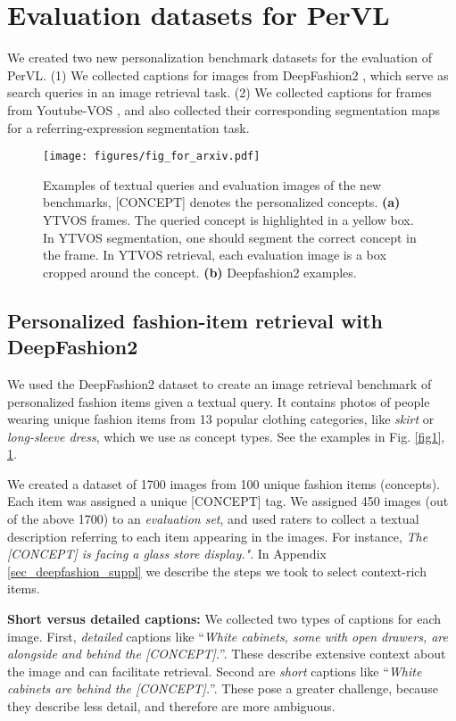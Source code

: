 \documentclass[runningheads]{llncs}
\newcommand{\PerVL}{PerVL {}}
\newcommand{\concept}{[CONCEPT]}
\begin{document}
\section{Evaluation datasets for \PerVL } 

We created two new personalization benchmark datasets for the evaluation of PerVL. (1) We collected captions for images from DeepFashion2 \cite{DeepFashion2}, which serve as search queries in an image retrieval task. (2) We collected captions for frames from Youtube-VOS \cite{xu2018youtube}, and also collected their corresponding segmentation maps for a referring-expression segmentation task.
\begin{figure}[t]
    \centering   
    \texttt{[image: figures/fig\_for\_arxiv.pdf]}
    \caption{Examples of textual queries and evaluation images of the new benchmarks, \concept{}  denotes the personalized concepts.  \textbf{(a)} YTVOS frames. The queried concept is highlighted in a yellow box. In YTVOS segmentation, one should segment the correct concept in the frame. In YTVOS retrieval, each evaluation image is a box cropped around the concept. \textbf{(b)} Deepfashion2 examples.
    }
    \label{fig_dataset_examples}
\end{figure}

\subsection{Personalized fashion-item retrieval with DeepFashion2}
We used the DeepFashion2 dataset \cite{DeepFashion2} to create an image retrieval benchmark of personalized fashion items given a textual query. It contains  photos of people wearing unique fashion items from 13 popular clothing categories, like \textit{skirt} or \textit{long-sleeve dress},  which we use as concept types. See the examples in  Fig. \ref{fig1}, \ref{fig_dataset_examples}.  


We created a dataset of 1700 images from 100 unique fashion items (concepts). Each item was assigned a unique \concept{} tag.  We assigned 450 images (out of the above 1700) to an \textit{evaluation set}, and used raters to collect a textual description referring to each item appearing in the images. For instance, \textit{The \concept{}
is facing a glass store display."}. In Appendix  \ref{sec_deepfashion_suppl} we describe the steps we took to select context-rich items. 

\textbf{Short versus detailed captions:}
We collected two types of captions for each image. First, \textit{detailed} captions like ``\textit{White cabinets, some with open drawers, are alongside and behind the \concept{}.}''. These describe extensive context about the image and can facilitate retrieval. Second are \textit{short} captions like ``\textit{White cabinets are behind the \concept{}.}''. These pose a greater challenge, because they describe less detail, and therefore are more ambiguous.
\end{document}
